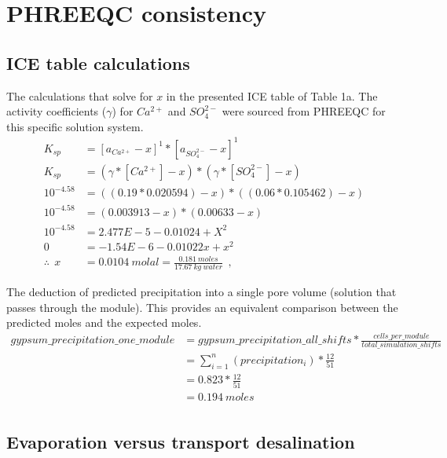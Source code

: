 \documentclass[fleqn,10pt]{wlscirep}
\begin{document}
\section{PHREEQC consistency}

\subsection{ICE table calculations}
The calculations that solve for $x$ in the presented ICE table of Table 1a. The activity coefficients ($\gamma$) for $Ca^{2+}$ and $SO_4^{2-}$ were sourced from PHREEQC for this specific solution system.
\begin{equation} \label{ice_calculations}
    \begin{split}
        K_{sp} &= [a_{Ca^{2+}} - x]^1 * [a_{SO_4^{2-}} - x]^1 \\ 
        K_{sp} &= (\gamma*[Ca^{2+}] - x) * (\gamma*[SO_4^{2-}] - x) \\ 
        10^{-4.58} &= ((0.19*0.020594) - x) * ((0.06*0.105462) - x) \\ 
        10^{-4.58} &= (0.003913 - x) * (0.00633 - x) \\
        10^{-4.58} &= 2.477E-5 - 0.01024 + X^2 \\
        0 &= -1.54E-6 - 0.01022x + x^2 \\
         \therefore ~~ x &= 0.0104~molal = \frac{0.181~moles}{17.67~kg~water}~~,
    \end{split}
\end{equation}

The deduction of predicted precipitation into a single pore volume (solution that passes through the module). This provides an equivalent comparison between the predicted moles and the expected moles.
\begin{equation} \label{PHREEQC_output_precipitation}
    \begin{split}
        gypsum\_precipitation\_one\_module &= gypsum\_precipitation\_all\_shifts * \frac{cells\_per\_module}{total\_simulation\_shifts} \\
         &= \sum_{i=1}^n (precipitation_i) * \frac{12}{51} \\ 
         &= 0.823 * \frac{12}{51} \\ 
         &= 0.194 ~moles \\
    \end{split}
\end{equation}

\subsection{Evaporation versus transport desalination}
\end{document}
